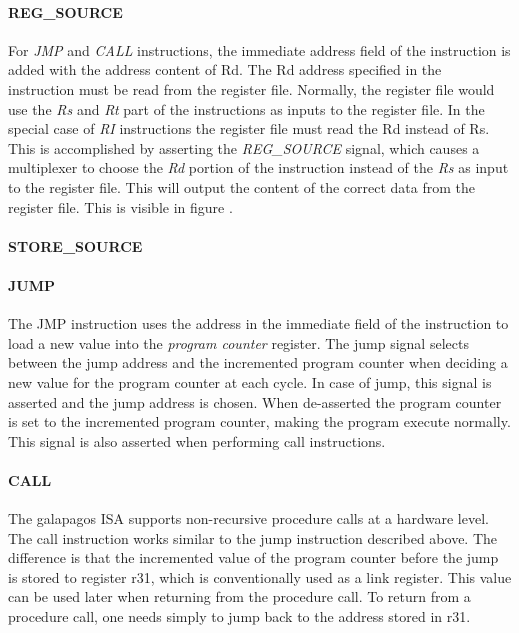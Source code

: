 \paragraph{REG\_SOURCE}
For \emph{JMP} and \emph{CALL} instructions, the immediate address field of the instruction is added with the address content of Rd.
The Rd address specified in the instruction must be read from the register file.
Normally, the register file would use the \emph{Rs} and \emph{Rt} part of the instructions as inputs to the register file.
In the special case of \emph{RI} instructions the register file must read the Rd instead of Rs.
This is accomplished by asserting the \emph{REG\_SOURCE} signal, which causes a multiplexer to choose the \emph{Rd} portion of the instruction instead of the \emph{Rs} as input to the register file.
This will output the content of the correct data from the register file.
This is visible in figure .


\paragraph{STORE\_SOURCE}


\paragraph{JUMP}
The JMP instruction uses the address in the immediate field of the instruction to load a new value into the \emph{program counter} register.
The jump signal selects between the jump address and the incremented program counter when deciding a new value for the program counter at each cycle.
In case of jump, this signal is asserted and the jump address is chosen.
When de-asserted the program counter is set to the incremented program counter, making the program execute normally.
This signal is also asserted when performing call instructions.   

\paragraph{CALL}
The \Gls{galapagos} ISA supports non-recursive procedure calls at a hardware level.
The call instruction works similar to the jump instruction described above.
The difference is that the incremented value of the program counter before the jump is stored to register r31, which is conventionally used as a link register.
This value can be used later when returning from the procedure call.
To return from a procedure call, one  needs simply to jump back to the address stored in r31.

